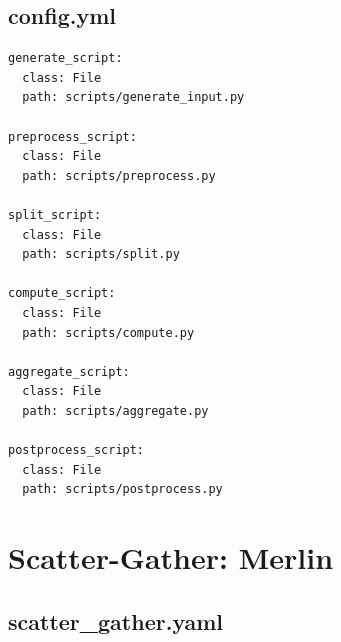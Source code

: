\section{config.yml}
\label{app:sg:streamflow:config}

\begin{lstlisting}[caption={config.yml: Eingabe-Konfiguration (StreamFlow)},
                   label={lst:app:sg:streamflow:config}]
generate_script:
  class: File
  path: scripts/generate_input.py

preprocess_script:
  class: File
  path: scripts/preprocess.py

split_script:
  class: File
  path: scripts/split.py

compute_script:
  class: File
  path: scripts/compute.py

aggregate_script:
  class: File
  path: scripts/aggregate.py

postprocess_script:
  class: File
  path: scripts/postprocess.py
\end{lstlisting}


\chapter{Scatter-Gather: Merlin}
\label{app:sg:merlin}

\section{scatter\_gather.yaml}
\label{app:sg:merlin:yaml}

